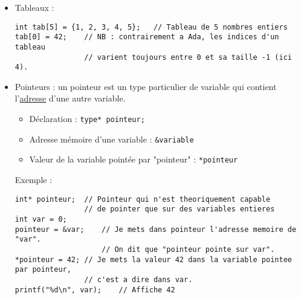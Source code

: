 \begin{itemize}
\begin{lstlisting}
while(i > 0)
{
	printf("%d ", i);
	i--;
}

\end{lstlisting}
Un if, un for ou un while peuvent ne pas être suivis d'un bloc (i.e. du code entre { et }), auquel cas seule l'instruction qui suit est concernée. Ici, par exemple, le if n'est pas suivi d'un bloc car il n'y a qu'une seule instruction, qui est l'appel à printf(). On aurait aussi bien pu écrire :\\
\begin{lstlisting}
for(i=0 ; i<5 ; i++)
	if(i % 2 == 0)
	{
			printf("%d ", i);
	}
\end{lstlisting}

\item Tableaux : \\
\begin{lstlisting}
int tab[5] = {1, 2, 3, 4, 5};	// Tableau de 5 nombres entiers
tab[0] = 42;	// NB : contrairement a Ada, les indices d'un tableau
				// varient toujours entre 0 et sa taille -1 (ici 4).
\end{lstlisting}

\item Pointeurs : un pointeur est un type particulier de variable qui contient l'\underline{adresse} d'une autre variable.\\
\begin{itemize}
\item Déclaration : \lstinline{type* pointeur;}
\item Adresse mémoire d'une variable : \lstinline{&variable}
\item Valeur de la variable pointée par "pointeur" : \lstinline{*pointeur}\\
\end{itemize}
Exemple : \\
\begin{lstlisting}
int* pointeur;	// Pointeur qui n'est theoriquement capable
				// de pointer que sur des variables entieres
int var = 0;
pointeur = &var;	// Je mets dans pointeur l'adresse memoire de "var".
					// On dit que "pointeur pointe sur var".
*pointeur = 42;	// Je mets la valeur 42 dans la variable pointee par pointeur,
				// c'est a dire dans var.
printf("%d\n", var);	// Affiche 42
\end{lstlisting}


\end{itemize}
